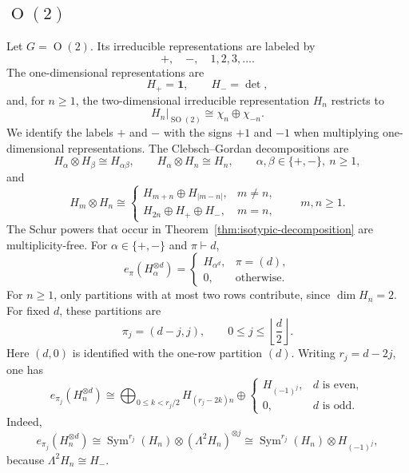 \documentclass[11pt]{article}
\newcommand{\Sym}{\operatorname{Sym}}
\newcommand{\SO}{\operatorname{SO}}
\theoremstyle{definition}
\begin{document}
\subsection{\texorpdfstring{$\operatorname{O}(2)$}{O(2)}}\label{sec:examples-o2}

Let $G=\operatorname{O}(2)$.  Its irreducible representations are labeled by
\[
  +,\quad -,\quad 1,2,3,\dots.
\]
The one-dimensional representations are
\[
  H_+ = \mathbf{1},
  \qquad
  H_- = \det,
\]
and, for $n\ge 1$, the two-dimensional irreducible representation $H_n$ restricts to
\[
  H_n|_{\SO(2)}
  \cong
  \chi_n
  \oplus
  \chi_{-n}.
\]
We identify the labels $+$ and $-$ with the signs $+1$ and $-1$ when multiplying one-dimensional representations. The Clebsch--Gordan decompositions are
\begin{equation}\label{eq:o2-clebsch-gordan-one-dimensional}
  H_\alpha\otimes H_\beta\cong H_{\alpha\beta},
  \qquad
  H_\alpha\otimes H_n\cong H_n,
  \qquad
  \alpha,\beta\in\{+,-\},\ n\ge 1,
\end{equation}
and
\begin{equation}\label{eq:o2-clebsch-gordan-two-dimensional}
  H_m\otimes H_n
  \cong
  \begin{cases}
    H_{m+n}\oplus H_{|m-n|}, & m\neq n,\\
    H_{2n}\oplus H_+\oplus H_-, & m=n,
  \end{cases}
  \qquad m,n\ge 1.
\end{equation}
The Schur powers that occur in Theorem~\ref{thm:isotypic-decomposition} are multiplicity-free.  For $\alpha\in\{+,-\}$ and $\pi\vdash d$,
\begin{equation}\label{eq:o2-schur-one-dimensional}
  e_\pi(H_\alpha^{\otimes d})
  =
  \begin{cases}
    H_{\alpha^d}, & \pi=(d),\\
    0, & \text{otherwise}.
  \end{cases}
\end{equation}
For $n\ge 1$, only partitions with at most two rows contribute, since $\dim H_n = 2$.  For fixed $d$, these partitions are
\[
  \pi_j=(d-j,j),
  \qquad
  0\le j\le \left\lfloor \frac d2\right\rfloor.
\]
Here $(d,0)$ is identified with the one-row partition $(d)$.  Writing $r_j=d-2j$, one has
\begin{equation}\label{eq:o2-schur-two-dimensional}
  e_{\pi_j}(H_n^{\otimes d})
  \cong
  \bigoplus_{0\le k<r_j/2} H_{(r_j-2k)n}
  \oplus
  \begin{cases}
    H_{(-1)^j}, & d\text{ is even},\\
    0, & d\text{ is odd}.
  \end{cases}
\end{equation}
Indeed,
\[
  e_{\pi_j}(H_n^{\otimes d})
  \cong
  \Sym^{r_j}(H_n)\otimes (\Lambda^2H_n)^{\otimes j}
  \cong
  \Sym^{r_j}(H_n)\otimes H_{(-1)^j},
\]
because $\Lambda^2H_n\cong H_-$.
\end{document}
